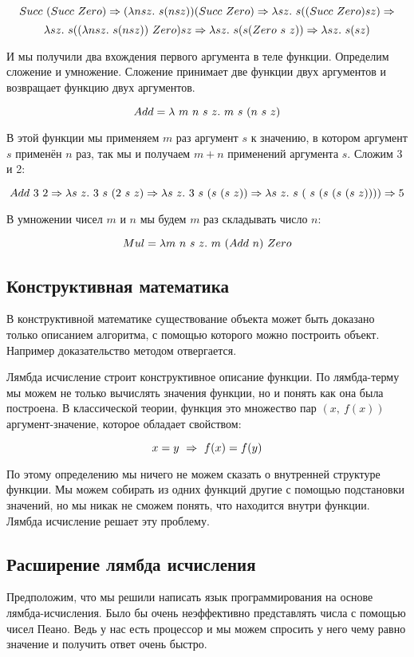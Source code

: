\[ Succ\ (Succ\ Zero) \Rightarrow (\lambda nsz .\  s(nsz)) (Succ\ Zero) 
    \Rightarrow \lambda sz .\  s((Succ\ Zero) sz) \Rightarrow \]
\[ \lambda sz .\  s((\lambda nsz .\  s(nsz))\ Zero)sz \Rightarrow
   \lambda sz .\  s (s(Zero\ s\ z)) \Rightarrow \lambda sz .\  s(sz) \]

И мы получили два вхождения первого аргумента в теле функции.
Определим сложение и умножение. Сложение принимает две функции
двух аргументов и возвращает функцию двух аргументов. 

\[ Add = \lambda\ m\ n\ s\ z \D m\ s\ (n\ s\ z) \]

В этой функции мы применяем $m$ раз аргумент $s$ к
значению, в котором аргумент $s$ применён $n$ раз, 
так мы и получаем $m+n$ применений аргумента $s$.
Сложим 3 и 2:

\[ Add\ 3\ 2 \RA \lambda s\ z \D 3\ s\ (2\ s\ z) 
    \RA \lambda s\ z \D 3\ s\ (s\ (s\ z)) 
    \RA \lambda s\ z \D s\ (\ s\ (s\ (s\ (s\ z)))) \RA 5 \]

В умножении чисел $m$ и $n$ мы будем $m$ раз складывать 
число $n$:

\[ Mul = \lambda m\ n\ s\ z \D m\ (Add\ n)\ Zero  \]

\subsection{Конструктивная математика}

В конструктивной математике существование объекта
может быть доказано только описанием алгоритма, с помощью
которого можно построить объект. Например доказательство
методом  отвергается. 

Лямбда исчисление строит конструктивное описание функции.
По лямбда-терму мы можем не только вычислять значения
функции, но и понять как она была построена. 
В классической теории, функция это множество
пар $(x,\ f(x))$ аргумент-значение, которое обладает свойством:

\[ x = y\ \Rightarrow\ f(x) = f(y)  \]

По этому определению мы ничего не можем сказать о внутренней 
структуре функции. Мы можем собирать из одних функций другие
с помощью подстановки значений, но мы никак не сможем понять, что находится
внутри функции. Лямбда исчисление решает эту проблему. 


\subsection{Расширение лямбда исчисления}

Предположим, что мы решили написать язык программирования на 
основе лямбда-исчисления. Было бы очень неэффективно представлять
числа с помощью чисел Пеано. Ведь у нас есть процессор и 
мы можем спросить у него чему равно значение и получить
ответ очень быстро.

